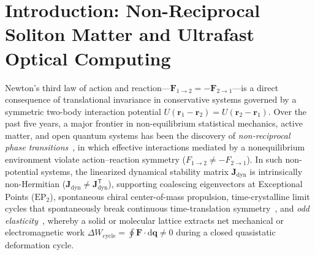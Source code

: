\documentclass[11pt,letterpaper]{article}
\begin{document}
\begin{abstract}
annealing to escape metastable spin-glass traps, we demonstrate $96.4\%$ ground-state success probability on $100$-vertex NP-hard MAX-CUT and Sherrington--Kirkpatrick spin-glass instances within $38.0\,\mathrm{ps}$ ($\sim 1.1$ cavity round trips)---a $>250{,}000\times$ speedup over kilometer-scale fiber degenerate optical parametric oscillator (DOPO) Coherent Ising Machines.
\end{abstract}

\section{Introduction: Non-Reciprocal Soliton Matter and Ultrafast Optical Computing}
\label{sec:intro}

Newton's third law of action and reaction---$\mathbf{F}_{1\to 2} = -\mathbf{F}_{2\to 1}$---is a direct consequence of translational invariance in conservative systems governed by a symmetric two-body interaction potential $U(\mathbf{r}_1 - \mathbf{r}_2) = U(\mathbf{r}_2 - \mathbf{r}_1)$. Over the past five years, a major frontier in non-equilibrium statistical mechanics, active matter, and open quantum systems has been the discovery of \textit{non-reciprocal phase transitions}~\cite{Fruchart2021,Scheibner2020,Shankar2022,Brauns2024}, in which effective interactions mediated by a nonequilibrium environment violate action--reaction symmetry ($F_{1\to 2} \neq -F_{2\to 1}$). In such non-potential systems, the linearized dynamical stability matrix $\mathbf{J}_{\mathrm{dyn}}$ is intrinsically non-Hermitian ($\mathbf{J}_{\mathrm{dyn}} \neq \mathbf{J}_{\mathrm{dyn}}^{\mathsf{T}}$), supporting coalescing eigenvectors at Exceptional Points ($\mathrm{EP}_2$), spontaneous chiral center-of-mass propulsion, time-crystalline limit cycles that spontaneously break continuous time-translation symmetry~\cite{Wilczek2012,Taheri2022,Zheludev2023}, and \textit{odd elasticity}~\cite{Scheibner2020}, whereby a solid or molecular lattice extracts net mechanical or electromagnetic work $\Delta W_{\mathrm{cycle}} = \oint \mathbf{F}\cdot \mathrm{d}\mathbf{q} \neq 0$ during a closed quasistatic deformation cycle.
\end{document}
